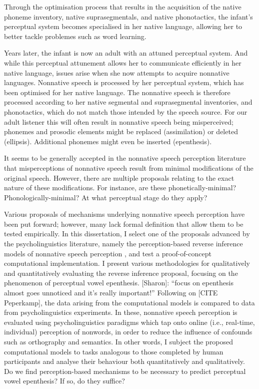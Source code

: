 Through the optimisation process that results in the acquisition of the native phoneme inventory, native suprasegmentals, and native phonotactics, the infant's perceptual system becomes specialised in her native language, allowing her to better tackle problemes such as word learning.  

Years later, the infant is now an adult with an attuned perceptual system. 
And while this perceptual attunement allows her to communicate efficiently in her native language, issues arise when she now attempts to acquire nonnative languages.
Nonnative speech is processed by her perceptual system, which has been optimised for her native language. The nonnative speech is therefore processed according to her native segmental and suprasegmental inventories, and phonotactics, which do not match those intended by the speech source. 
For our adult listener this will often result in nonnative speech being misperceived; phonemes and prosodic elements might be replaced (assimilation) or deleted (ellipsis). Additional phonemes might even be inserted (epenthesis).

It seems to be generally accepted in the nonnative speech perception literature that misperceptions of nonnative speech result from minimal modifications of the original speech. However, there are multiple proposals relating to the exact nature of these modifications. For instance, are these phonetically-minimal? Phonologically-minimal? At what perceptual stage do they apply? 

Various proposals of mechanisms underlying nonnative speech perception have been put forward; however, many lack formal definition that allow them to be tested empirically.  
In this dissertation, I select one of the proposals advanced by the psycholinguistics literature, namely the perception-based reverse inference models of nonnative speech perception \cite{dupoux2011, wilson2014}, and test a proof-of-concept computational implementation. 
I present various methodologies for qualitatively and quantitatively evaluating the reverse inference proposal, focusing on the phenomenon of perceptual vowel epenthesis.
{\color{red}[Sharon]: ``focus on epenthesis almost goes unnoticed and it's really important!''}
Following on [CITE Peperkamp], the data arising from the computational models is compared to data from psycholinguistics experiments. In these, nonnative speech perception is evaluated using psycholinguistics paradigms which tap onto online (i.e., real-time, individual) perception of nonwords, in order to reduce the influence of confounds such as orthography and semantics.
In other words, I subject the proposed computational models to tasks analogous to those completed by human participants and analyse their behaviour both quantitatively and qualitatively. Do we find perception-based mechanisms to be necessary to predict perceptual vowel epenthesis? If so, do they suffice? 

